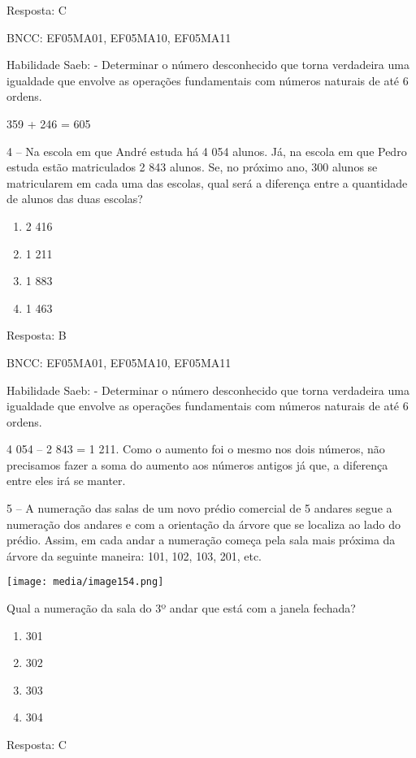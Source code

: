 Resposta: C

BNCC: EF05MA01, EF05MA10, EF05MA11

Habilidade Saeb: - Determinar o número desconhecido que torna verdadeira
uma igualdade que envolve as operações fundamentais com números naturais
de até 6 ordens.

359 + 246 = 605

4 -- Na escola em que André estuda há 4 054 alunos. Já, na escola em que
Pedro estuda estão matriculados 2 843 alunos. Se, no próximo ano, 300
alunos se matricularem em cada uma das escolas, qual será a diferença
entre a quantidade de alunos das duas escolas?

\begin{enumerate}
\def\labelenumi{\alph{enumi})}
\item
  2 416
\item
  1 211
\item
  1 883
\item
  1 463
\end{enumerate}

Resposta: B

BNCC: EF05MA01, EF05MA10, EF05MA11

Habilidade Saeb: - Determinar o número desconhecido que torna verdadeira
uma igualdade que envolve as operações fundamentais com números naturais
de até 6 ordens.

4 054 -- 2 843 = 1 211. Como o aumento foi o mesmo nos dois números, não
precisamos fazer a soma do aumento aos números antigos já que, a
diferença entre eles irá se manter.

5 -- A numeração das salas de um novo prédio comercial de 5 andares
segue a numeração dos andares e com a orientação da árvore que se
localiza ao lado do prédio. Assim, em cada andar a numeração começa pela
sala mais próxima da árvore da seguinte maneira: 101, 102, 103, 201,
etc.

\texttt{[image: media/image154.png]}

Qual a numeração da sala do 3º andar que está com a janela fechada?

\begin{enumerate}
\def\labelenumi{\alph{enumi})}
\item
  301
\item
  302
\item
  303
\item
  304
\end{enumerate}

Resposta: C

